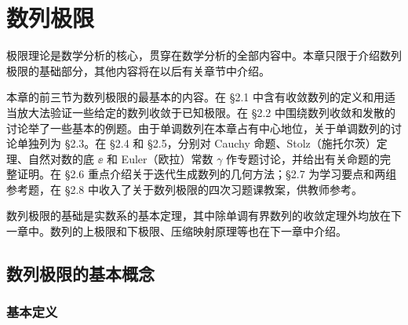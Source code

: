 \chapter{数列极限}


极限理论是数学分析的核心，贯穿在数学分析的全部内容中。本章只限于介绍数列极限的基础部分，其他内容将在以后有关章节中介绍。

本章的前三节为数列极限的最基本的内容。在 §2.1 中含有收敛数列的定义和用适当放大法验证一些给定的数列收敛于已知极限。在 §2.2 中围绕数列收敛和发散的讨论举了一些基本的例题。由于单调数列在本章占有中心地位，关于单调数列的讨论单独列为 §2.3。在 §2.4 和 §2.5，分别对 Cauchy 命题、Stolz（施托尔茨）定理、自然对数的底 $\ee$ 和 Euler（欧拉）常数 $\gamma$ 作专题讨论，并给出有关命题的完整证明。在 §2.6 重点介绍关于迭代生成数列的几何方法；§2.7 为学习要点和两组参考题，在 §2.8 中收入了关于数列极限的四次习题课教案，供教师参考。

数列极限的基础是实数系的基本定理，其中除单调有界数列的收敛定理外均放在下一章中。数列的上极限和下极限、压缩映射原理等也在下一章中介绍。

\section{数列极限的基本概念}

\subsection{基本定义}


